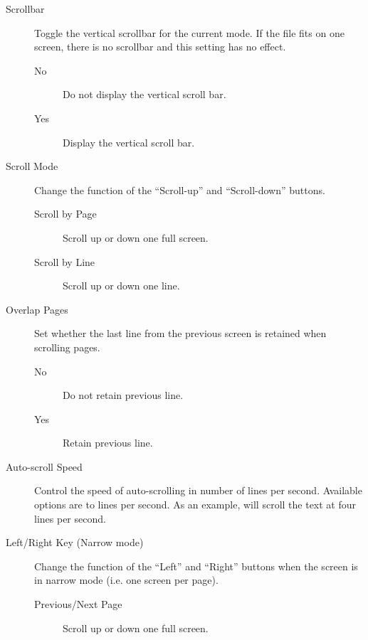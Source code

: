 \begin{description}
\begin{description}
\begin{description}
\begin{description}
                    \item[Scrollbar] Toggle the vertical scrollbar for the
                    current mode. If the file fits on one screen, there is no
                    scrollbar and this setting has no effect.
                        \begin{description}
                            \item[No] Do not display the vertical scroll bar.
                            \item[Yes] Display the vertical scroll bar.
                        \end{description}
                    \item[Scroll Mode] Change the function of the ``Scroll-up''
                    and ``Scroll-down'' buttons.
                        \begin{description}
                            \item[Scroll by Page] Scroll up or down one full screen.
                            \item[Scroll by Line] Scroll up or down one line.
                        \end{description}
                    \item[Overlap Pages] Set whether the last line from the
                    previous screen is retained when scrolling pages.
                        \begin{description}
                           \item[No] Do not retain previous line.
                           \item[Yes] Retain previous line.
                        \end{description}
                    \item[Auto-scroll Speed] Control the speed of auto-scrolling
                    in number of lines per second.  Available options are
                     to  lines per second. As an example,
                     will scroll the text at four lines per second.
                    \item[Left/Right Key (Narrow mode)] Change the function of
                    the ``Left'' and ``Right'' buttons when the screen is in
                    narrow mode (i.e. one screen per page).
                    \begin{description}
                        \item[Previous/Next Page] Scroll up or down one full screen.

\end{description}
\end{description}
\end{description}
\end{description}
\end{description}
